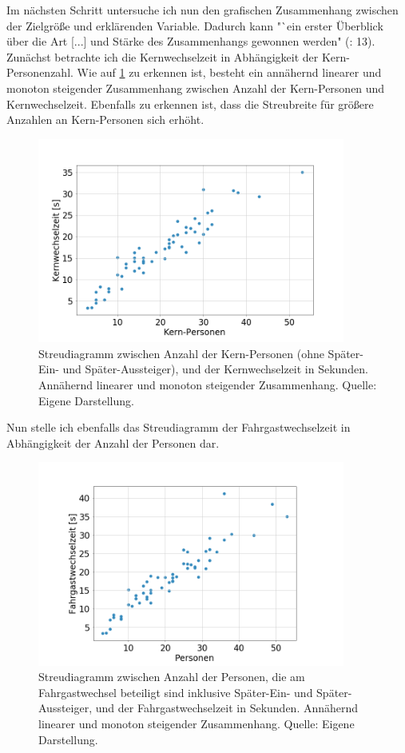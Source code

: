 Im nächsten Schritt untersuche ich nun den grafischen Zusammenhang zwischen der Zielgröße und erklärenden Variable. Dadurch kann "`ein erster Überblick über die Art [...] und Stärke des Zusammenhangs gewonnen werden" (\cite{Fahrmeir.2009}: 13). \\
Zunächst betrachte ich die Kernwechselzeit in Abhängigkeit der Kern-Personenzahl. Wie auf \figurename \ref{fig:zusammenhangsAnalyse} zu erkennen ist, besteht ein annähernd linearer und monoton steigender Zusammenhang zwischen Anzahl der Kern-Personen und Kernwechselzeit. Ebenfalls zu erkennen ist, dass die Streubreite für größere Anzahlen an Kern-Personen sich erhöht.
\begin{figure}[H]
	\centering
		\includegraphics[width=0.9\textwidth]{pictures/data_evaluation/transferTime/core_coherence_analysis.png}
	\caption{Streudiagramm zwischen Anzahl der Kern-Personen (ohne Später-Ein- und Später-Aussteiger), und der Kernwechselzeit in Sekunden. Annähernd linearer und monoton steigender Zusammenhang. Quelle: Eigene Darstellung.}
	\label{fig:zusammenhangsAnalyse}
\end{figure}
Nun stelle ich ebenfalls das Streudiagramm der Fahrgastwechselzeit in Abhängigkeit der Anzahl der Personen dar.
\begin{figure}[H]
	\centering
		\includegraphics[width=0.9\textwidth]{pictures/data_evaluation/transferTime/coherence_analysis.png}
	\caption{Streudiagramm zwischen Anzahl der Personen, die am Fahrgastwechsel beteiligt sind inklusive Später-Ein- und Später-Aussteiger, und der Fahrgastwechselzeit in Sekunden. Annähernd linearer und monoton steigender Zusammenhang. Quelle: Eigene Darstellung.}
	\label{fig:zusammenhangsAnalyseAlle}
\end{figure}
